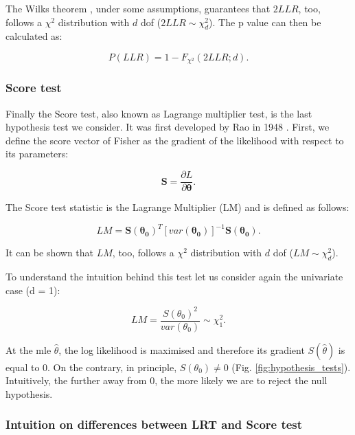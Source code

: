 The Wilks theorem \cite{wilks1938large}, under some assumptions, guarantees that $2LLR$, too, follows a $\chi^2$ distribution with $d$ dof ($2LLR \sim \chi^2_d$).
The p value can then be calculated as:

\begin{equation}\label{eq:lrt_p_value}
    P(LLR) = 1-F_{\chi^2}(2LLR; d).
\end{equation}

\subsubsection{Score test}

Finally the Score test, also known as Lagrange multiplier test, is the last hypothesis test we consider. 
It was first developed by Rao in 1948 \cite{rao1948large}.
First, we define the score vector of Fisher as the gradient of the likelihood with respect to its parameters:

\begin{equation}\label{eq:score_vector}
    \mathbf{S} = \frac{\partial L}{\partial \boldsymbol{\theta}}.
\end{equation}

The Score test statistic is the Lagrange Multiplier (LM) and is defined as follows:

\begin{equation}\label{eq:lagrange_multiplier}
    LM = \mathbf{S}(\boldsymbol{\theta_0})^T [var(\boldsymbol{\theta_0})]^{-1}\mathbf{S}(\boldsymbol{\theta_0}). 
\end{equation}

It can be shown that $LM$, too, follows a $\chi^2$ distribution with $d$ dof ($LM \sim \chi^2_d$).

To understand the intuition behind this test let us consider again the univariate case (d = 1):

\begin{equation}\label{eq:lagrange_multiplier_univariate}
    LM = \frac{S(\theta_0)^2}{var(\theta_0)} \sim \chi^2_1.
\end{equation}

At the \gls{mle} $\hat{\theta}$, the log likelihood is maximised and therefore its gradient $S(\hat{\theta})$ is equal to $0$.
On the contrary, in principle, $ S(\theta_0) \neq 0 $ (Fig. \ref{fig:hypothesis_tests}). 
Intuitively, the further away from 0, the more likely we are to reject the null hypothesis.

\newpage

\subsubsection{Intuition on differences between LRT and Score test}

